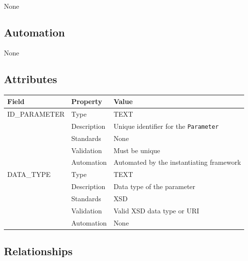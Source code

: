 \documentclass[
]{article}
\newcounter{none}
\begin{document}
None

\subsection{Automation}\label{automation-21}

None

\subsection{Attributes}\label{attributes-18}

{\def\LTcaptype{none} 
\begin{longtable}[]{@{}lll@{}}
\toprule\noalign{}
Field & Property & Value \\
\midrule\noalign{}
\endhead
\bottomrule\noalign{}
\endlastfoot
ID\_PARAMETER & Type & TEXT \\
& Description & Unique identifier for the \texttt{Parameter} \\
& Standards & None \\
& Validation & Must be unique \\
& Automation & Automated by the instantiating framework \\
DATA\_TYPE & Type & TEXT \\
& Description & Data type of the parameter \\
& Standards & XSD \\
& Validation & Valid XSD data type or URI \\
& Automation & None \\
\end{longtable}
}

\subsection{Relationships}\label{relationships-17}
\end{document}
